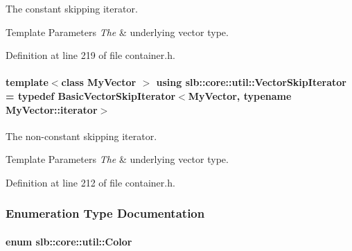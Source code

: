 The constant skipping iterator. 


\begin{DoxyTemplParams}{Template Parameters}
{\em The} & underlying vector type. \\
\hline
\end{DoxyTemplParams}


Definition at line 219 of file container.\+h.

\paragraph[{\texorpdfstring{Vector\+Skip\+Iterator}{VectorSkipIterator}}]{\setlength{\rightskip}{0pt plus 5cm}template$<$class My\+Vector $>$ using {\bf slb\+::core\+::util\+::\+Vector\+Skip\+Iterator} = typedef {\bf Basic\+Vector\+Skip\+Iterator}$<$My\+Vector, typename My\+Vector\+::iterator$>$}\hypertarget{namespaceslb_1_1core_1_1util_a52016fe00a4fae8791643b870848a79f}{}\label{namespaceslb_1_1core_1_1util_a52016fe00a4fae8791643b870848a79f}


The non-\/constant skipping iterator. 


\begin{DoxyTemplParams}{Template Parameters}
{\em The} & underlying vector type. \\
\hline
\end{DoxyTemplParams}


Definition at line 212 of file container.\+h.



\subsubsection{Enumeration Type Documentation}
\paragraph[{\texorpdfstring{Color}{Color}}]{\setlength{\rightskip}{0pt plus 5cm}enum {\bf slb\+::core\+::util\+::\+Color}\hspace{0.3cm}{\ttfamily [strong]}}\hypertarget{namespaceslb_1_1core_1_1util_afae144e1a65658559242f5cf4fce426f}{}\label{namespaceslb_1_1core_1_1util_afae144e1a65658559242f5cf4fce426f}


